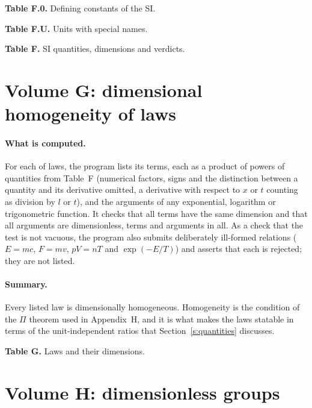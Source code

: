 \begin{center}\textbf{Table F.0.} Defining constants of the SI.\end{center}


\begin{center}\textbf{Table F.U.} Units with special names.\end{center}


\begin{center}\textbf{Table F.} SI quantities, dimensions and verdicts.\end{center}


\section{Volume G: dimensional homogeneity of laws}\label{app:g}

\paragraph{What is computed.} For each of \vvNG{} laws, the program lists its terms, each as a product of powers of quantities from Table~F (numerical factors, signs and the distinction between a quantity and its derivative omitted, a derivative with respect to $x$ or $t$ counting as division by $l$ or $t$), and the arguments of any exponential, logarithm or trigonometric function. It checks that all terms have the same dimension and that all arguments are dimensionless, \vvNGterms{} terms and arguments in all. As a check that the test is not vacuous, the program also submits \vvNGbad{} deliberately ill-formed relations ($E = mc$, $F = mv$, $pV = nT$ and $\exp(-E/T)$) and asserts that each is rejected; they are not listed.

\paragraph{Summary.} Every listed law is dimensionally homogeneous. Homogeneity is the condition of the $\Pi$ theorem used in Appendix~H, and it is what makes the laws statable in terms of the unit-independent ratios that Section~\ref{s:quantities} discusses.

\begin{center}\textbf{Table G.} Laws and their dimensions.\end{center}


\section{Volume H: dimensionless groups}\label{app:h}

